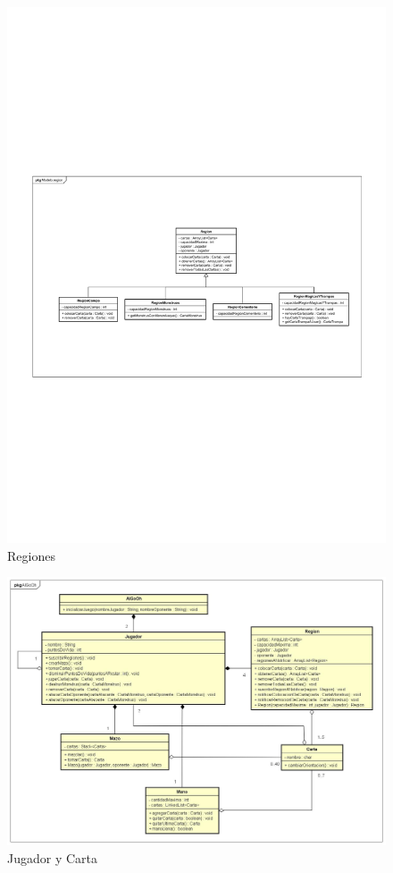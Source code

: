 \begin{figure}[H]
	\centering
	\includegraphics[scale=0.8]{includes/class_Regiones}
	\caption{Regiones}
	\label{class_Regiones}
\end{figure}



\begin{figure}[H]
	\centering
	\includegraphics[scale=0.3]{includes/Jugador}
	\caption{Jugador y Carta}
	\label{Jugador}
\end{figure}



